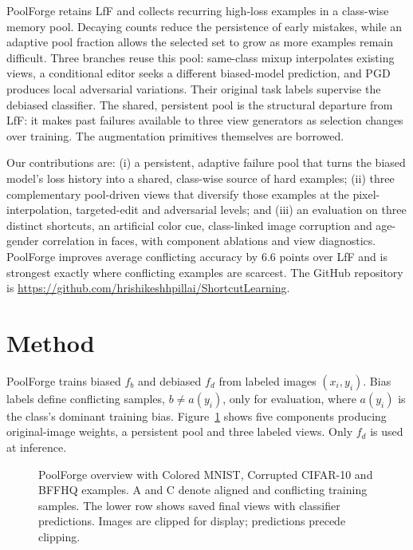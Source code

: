\documentclass[10pt,twocolumn,letterpaper]{article}
\begin{document}
PoolForge retains LfF and collects recurring high-loss examples in a class-wise memory pool. Decaying counts reduce the persistence of early mistakes, while an adaptive pool fraction allows the selected set to grow as more examples remain difficult. Three branches reuse this pool: same-class mixup interpolates existing views, a conditional editor seeks a different biased-model prediction, and PGD produces local adversarial variations. Their original task labels supervise the debiased classifier. The shared, persistent pool is the structural departure from LfF: it makes past failures available to three view generators as selection changes over training. The augmentation primitives themselves are borrowed.

Our contributions are: (i) a persistent, adaptive failure pool that turns the biased model's loss history into a shared, class-wise source of hard examples; (ii) three complementary pool-driven views that diversify those examples at the pixel-interpolation, targeted-edit and adversarial levels; and (iii) an evaluation on three distinct shortcuts, an artificial color cue, class-linked image corruption and age-gender correlation in faces, with component ablations and view diagnostics. PoolForge improves average conflicting accuracy by 6.6 points over LfF and is strongest exactly where conflicting examples are scarcest. The GitHub repository is \url{https://github.com/hrishikeshhpillai/ShortcutLearning}.

\section{Method}
PoolForge trains biased $f_b$ and debiased $f_d$ from labeled images $(x_i,y_i)$. Bias labels define conflicting samples, $b\ne a(y_i)$, only for evaluation, where $a(y_i)$ is the class's dominant training bias. Figure~\ref{fig:flow} shows five components producing original-image weights, a persistent pool and three labeled views. Only $f_d$ is used at inference.

\begin{figure}[t]
\centering
\resizebox{\textwidth}{!}{}
\caption{PoolForge overview with Colored MNIST, Corrupted CIFAR-10 and BFFHQ examples. A and C denote aligned and conflicting training samples. The lower row shows saved final views with classifier predictions. Images are clipped for display; predictions precede clipping.}
\label{fig:flow}
\end{figure}
\end{document}
